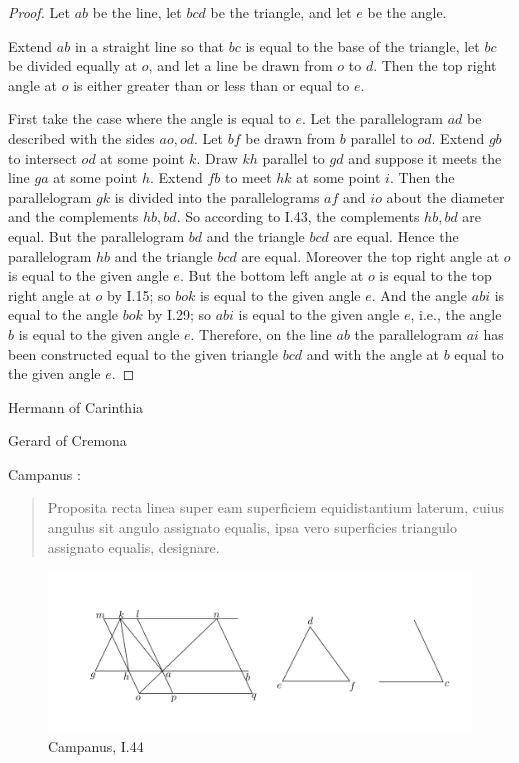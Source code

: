 \documentclass{article}
\begin{document}
\begin{proof}
Let $ab$ be the line, let $bcd$ be the triangle, and let $e$ be the angle.

Extend $ab$ in a straight line so that $bc$ is equal to the base of the triangle, let
$bc$ be divided equally at $o$, and let a line be drawn from $o$ to $d$. Then 
the top right angle at  $o$ is either greater than or less than or equal to $e$.

First take the case where the angle is equal to $e$.  
Let the parallelogram $ad$ be described with the sides $ao,od$. 
Let $bf$ be drawn from $b$ parallel to $od$. 
Extend $gb$ to intersect $od$ at some point $k$. 
Draw $kh$ parallel to $gd$ and suppose it meets the line $ga$ at some point $h$.
Extend $fb$ to meet $hk$ at some point $i$. Then 
the parallelogram $gk$ is divided into the parallelograms $af$ and $io$ about the diameter
and the complements $hb,bd$. So according
to I.43, the complements $hb,bd$ are equal. But
the parallelogram $bd$ and the triangle $bcd$ are equal. Hence
the parallelogram $hb$ and the triangle $bcd$ are equal.
Moreover the top right angle at $o$  is equal to the given angle $e$. But the bottom left angle at $o$ is
equal to the top right angle at $o$ by I.15; so $bok$ is equal to the given angle $e$.
And the angle $abi$ is equal to the angle $bok$ by I.29; so $abi$ is equal to the given angle $e$, i.e.,
the angle $b$ is equal to the given angle $e$.
Therefore, on the line $ab$ the parallelogram $ai$ has been constructed equal to the given triangle
$bcd$ and with the angle at $b$ equal to the given angle $e$.
\end{proof}


Hermann of Carinthia \cite{hermann}

Gerard of Cremona \cite{gerard}

Campanus \cite[pp.~91--92]{campanusI}:

\begin{quote}
Proposita recta linea super eam superficiem equidistantium laterum,
cuius angulus sit angulo assignato equalis, ipsa vero superficies triangulo
assignato equalis, designare.
\end{quote}

\begin{figure}
\begin{center}
\includegraphics{campanusI44.png}
\end{center}
\caption{Campanus, I.44}
\label{campanusI44}
\end{figure}
\end{document}
